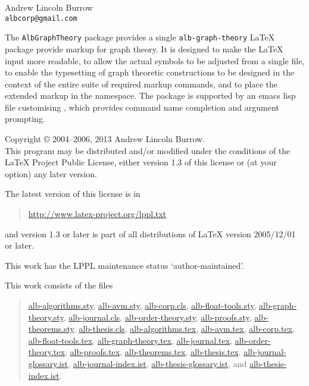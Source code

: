 \documentclass[11pt,a4paper,oneside,titlepage]{alb-corp}
\begin{document}


\begin{albTitlePage}


  Andrew Lincoln Burrow\\
  \texttt{albcorp@gmail.com}



  The \texttt{AlbGraphTheory} package provides a single
  \texttt{alb-graph-theory} \LaTeX{} package provide markup for graph
  theory.  It is designed to make the \LaTeX{} input more readable, to
  allow the actual symbols to be adjusted from a single file, to enable
  the typesetting of graph theoretic constructions to be designed in the
  context of the entire suite of required markup commands, and to place
  the extended markup in the \albLogo{} namespace.  The package is
  supported by an emacs lisp file customising \AUCTeX{}, which provides
  command name completion and argument prompting.



  Copyright \copyright{} 2004--2006, 2013 Andrew Lincoln Burrow.\\
  This program may be distributed and/or modified under the conditions
  of the \LaTeX{} Project Public License, either version 1.3 of this
  license or (at your option) any later version.

  \medskip{}

  The latest version of this license is in
  \begin{quote}
    \url{http://www.latex-project.org/lppl.txt}
  \end{quote}
  and version 1.3 or later is part of all distributions of LaTeX version
  2005/12/01 or later.

  \medskip{}

  This work has the LPPL maintenance status `author-maintained'.

  \medskip{}

  This work consists of the files
  \begin{quote}
    \begin{flushleft}
      \url{alb-algorithms.sty}, \url{alb-avm.sty}, \url{alb-corp.cls},
      \url{alb-float-tools.sty}, \url{alb-graph-theory.sty},
      \url{alb-journal.cls}, \url{alb-order-theory.sty},
      \url{alb-proofs.sty}, \url{alb-theorems.sty},
      \url{alb-thesis.cls}, \url{alb-algorithms.tex}, \url{alb-avm.tex},
      \url{alb-corp.tex}, \url{alb-float-tools.tex},
      \url{alb-graph-theory.tex}, \url{alb-journal.tex},
      \url{alb-order-theory.tex}, \url{alb-proofs.tex},
      \url{alb-theorems.tex}, \url{alb-thesis.tex}.
      \url{alb-journal-glossary.ist}, \url{alb-journal-index.ist},
      \url{alb-thesis-glossary.ist}, and \url{alb-thesis-index.ist}.
    \end{flushleft}
  \end{quote}



\end{albTitlePage}
\end{document}
